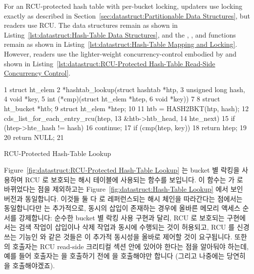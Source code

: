 For an RCU-protected hash table with per-bucket locking,
updaters use locking exactly as described in
Section~\ref{sec:datastruct:Partitionable Data Structures},
but readers use RCU.
The data structures remain as shown in
Listing~\ref{lst:datastruct:Hash-Table Data Structures},
and the , , and 
functions remain as shown in
Listing~\ref{lst:datastruct:Hash-Table Mapping and Locking}.
However, readers use the lighter-weight concurrency-control embodied
by  and 
shown in
Listing~\ref{lst:datastruct:RCU-Protected Hash-Table Read-Side Concurrency Control}.
\fi

\begin{listing}[tb]
{ \scriptsize
\begin{verbbox}
 1 struct ht_elem
 2 *hashtab_lookup(struct hashtab *htp,
 3                 unsigned long hash,
 4                 void *key,
 5                 int (*cmp)(struct ht_elem *htep,
 6                            void *key))
 7 {
 8   struct ht_bucket *htb;
 9   struct ht_elem *htep;
10 
11   htb = HASH2BKT(htp, hash);
12   cds_list_for_each_entry_rcu(htep,
13                               &htb->htb_head,
14                               hte_next) {
15     if (htep->hte_hash != hash)
16       continue;
17     if (cmp(htep, key))
18       return htep;
19   }
20   return NULL;
21 }
\end{verbbox}
}
\centering
\theverbbox
\caption{RCU-Protected Hash-Table Lookup}
\label{lst:datastruct:RCU-Protected Hash-Table Lookup}
\end{listing}

Figure~\ref{fig:datastruct:RCU-Protected Hash-Table Lookup} 는 bucket 별 락킹을
사용하며 RCU 로 보호되는 해시 테이블에 사용되는  함수를
보입니다.
이 함수는  가 
로 바뀌었다는 점을 제외하고는
Figure~\ref{fig:datastruct:Hash-Table Lookup} 에서 보인 버전과 동일합니다.
이것들 둘 다  로 레퍼런스되는 해시 체인을 따라간다는 점에서는
동일합니다만  는 추가적으로, 동시의 삽입이
존재하는 경우에 올바른 메모리 액세스 순서를 강제합니다:
순수한 bucket 별 락킹 사용 구현과 달리, RCU 로 보호되는 구현에서는 검색 작업이
삽입이나 삭제 작업과 동시에 수행되는 것이 허용되고, RCU 를 신경쓰는 기능인
 와 같은 것들은 이 추가적 동시성을 올바로
제어할 것이 요구됩니다.
또한  의 호출자는 RCU read-side 크리티컬 섹션 안에 있어야
한다는 점을 알아둬야 하는데, 예를 들어 호출자는  을
호출하기 전에  을 호출해야만 합니다 (그리고 나중에는
당연히  을 호출해야겠죠).
\iffalse

